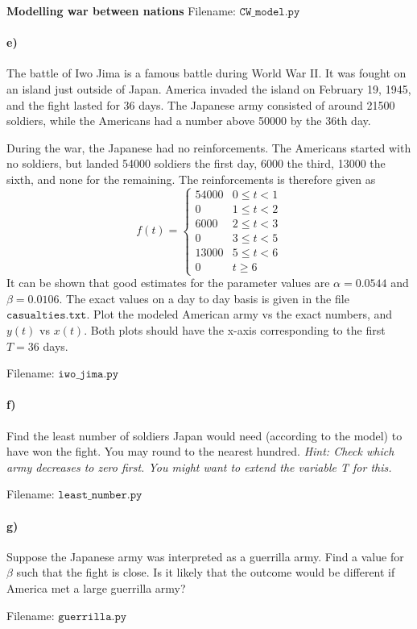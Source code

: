 \begin{Problem}{\textbf{Modelling war between nations}}
Filename: $\texttt{CW\_model.py}$

\paragraph{e)}
The battle of Iwo Jima is a famous battle during World War II. It was fought on
an island just outside of Japan. America invaded the island on February 19, 1945,
and the fight lasted for 36 days. The Japanese army consisted of around 21500
soldiers, while the Americans had a number above 50000 by the 36th day.

During the war, the Japanese had no reinforcements. The Americans started with no
soldiers, but landed 54000 soldiers the first day, 6000 the third, 13000 the sixth, and none
for the remaining. The reinforcements is therefore given as
\begin{equation*}
    f(t)=\begin{cases}
        54000 & 0\leq t<1 \\
        0 & 1 \leq t < 2 \\
        6000 & 2 \leq t < 3 \\
        0 & 3 \leq t < 5 \\
        13000 & 5 \leq t < 6 \\
        0 & t \geq 6
    \end{cases}
\end{equation*}
It can be shown that good estimates for the parameter values are $\alpha=0.0544$
and $\beta = 0.0106$. %
The exact values on a day to day basis is
given in the file $\texttt{casualties.txt}$. Plot
the modeled American army vs the exact numbers, and $y(t)$ vs $x(t)$.
Both plots should have the x-axis corresponding to the first $T = 36$ days.

Filename: $\texttt{iwo\_jima.py}$

\paragraph{f)}
Find the least number of soldiers Japan would need (according to the model)
to have won the fight. You may round to the nearest hundred.
\emph{Hint: Check which army decreases to zero first. You might want to extend the
variable T for this.}

Filename: $\texttt{least\_number.py}$

\paragraph{g)}
Suppose the Japanese army was interpreted as a guerrilla army. Find a value for $\beta$
such that the fight is close. Is it likely that the outcome would be different if
America met a large guerrilla army?

Filename: $\texttt{guerrilla.py}$
\end{Problem}

